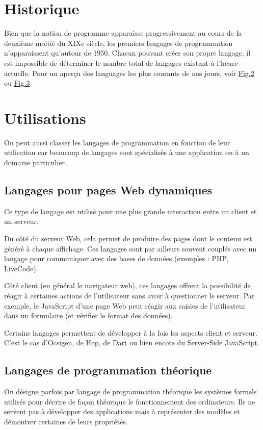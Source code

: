 \documentclass[a4paper,12pt]{article}
\begin{document}
\section{Historique}

Bien que la notion de programme apparaisse progressivement au cours de la deuxième moitié du XIXe siècle, les premiers langages de programmation n'apparaissent qu'autour de 1950. Chacun pouvant créer son propre langage, il est impossible de déterminer le nombre total de langages existant à l'heure actuelle.
Pour un aperçu des languages les plus courants de nos jours, voir \hyperref[ranking]{Fig.2} ou \hyperref[pie]{Fig.3}.

\section{Utilisations}

On peut aussi classer les langages de programmation en fonction de leur utilisation car beaucoup de langages sont spécialisés à une application ou à un domaine particulier.

\subsection{Langages pour pages Web dynamiques}

Ce type de langage est utilisé pour une plus grande interaction entre un client et un serveur.

Du côté du serveur Web, cela permet de produire des pages dont le contenu est généré à chaque affichage. Ces langages sont par ailleurs souvent couplés avec un langage pour communiquer avec des bases de données (exemples : PHP, LiveCode).

Côté client (en général le navigateur web), ces langages offrent la possibilité de réagir à certaines actions de l'utilisateur sans avoir à questionner le serveur. Par exemple, le JavaScript d'une page Web peut réagir aux saisies de l'utilisateur dans un formulaire (et vérifier le format des données).

Certains langages permettent de développer à la fois les aspects client et serveur. C'est le cas d'Ocsigen, de Hop, de Dart ou bien encore du Server-Side JavaScript.

\subsection{Langages de programmation théorique}

On désigne parfois par langage de programmation théorique les systèmes formels utilisés pour décrire de façon théorique le fonctionnement des ordinateurs. Ils ne servent pas à développer des applications mais à représenter des modèles et démontrer certaines de leurs propriétés.
\end{document}
